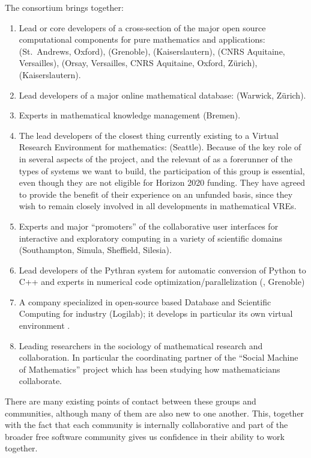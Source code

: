 \documentclass[noworkareas,deliverables,\classoptions]{euproposal}       %
\begin{document}
\begin{proposal}
The consortium brings together:
\begin{enumerate}
\item \label{mathsoftware} Lead or core developers of a cross-section of the major open
  source computational components for pure mathematics and applications: \GAP (St.~Andrews,
  Oxford), \Linbox (Grenoble), \MPIR (Kaiserslautern), \Pari (CNRS Aquitaine, Versailles), \Sage
  (Orsay, Versailles, CNRS Aquitaine, Oxford, Zürich), \Singular (Kaiserslautern).
\item \label{mathdb} Lead developers of a major online mathematical database: \LMFDB
  (Warwick, Zürich).
\item \label{mathknowledge} Experts in mathematical knowledge management (Bremen).
\item \label{smc} The lead developers of the closest thing currently existing to a Virtual
  Research Environment for mathematics: \SMC (Seattle). Because of the key role of \Sage
  in several aspects of the project, and the relevant of \SMC as a forerunner of the types
  of systems we want to build, the participation of this group is essential, even though
  they are not eligible for Horizon 2020 funding. They have agreed to provide the benefit
  of their experience on an unfunded basis, since they wish to remain closely involved in
  all developments in mathematical VREs.
\item \label{jupyter} Experts and major ``promoters'' of the \Jupyter collaborative user
  interfaces for interactive and exploratory computing in a variety of scientific domains
  (Southampton, Simula, Sheffield, Silesia).
\item \label{pythran} Lead developers of the Pythran system for automatic conversion of
  Python to C++ and experts in numerical code optimization/parallelization (,
  Grenoble)
\item \label{logilab} A company specialized in open-source based Database and Scientific
  Computing for industry (Logilab); it develops in particular its own virtual environment
  \Simulagora.
\item \label{social} Leading researchers in the sociology of mathematical research and
  collaboration. In particular the coordinating partner of the ``Social Machine of
  Mathematics'' project which has been studying how mathematicians collaborate.
\end{enumerate}





There are many existing points of contact between these groups  and
communities, although many of them are also new to one another. This,
together with the fact that each community is internally collaborative
and part of the broader free software community gives us confidence in
their ability to work together.


\end{proposal}
\end{document}
